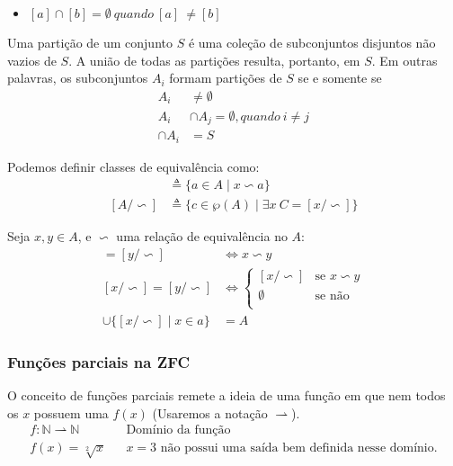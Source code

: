 \documentclass[12pt, a4paper]{article}
\begin{document}
\begin{itemize}
\item $[a] \cap [b] = \emptyset ~quando~ [a]~ \neq[b]$\\
\end{itemize}

Uma partição de um conjunto $S$ é uma coleção de subconjuntos disjuntos não vazios de $S$. A união de todas as partições resulta, portanto, em $S$. Em outras palavras, os subconjuntos $A_i$ formam partições de $S$ se e somente se\\
\begin{align*}
A_i &\neq \emptyset\\
A_i &\cap A_j = \emptyset, quando~i \neq j\\
\cap A_i &= S
\end{align*}

Podemos definir classes de equivalência como:\\
\begin{align*}
[x/\backsim] &\triangleq \{a \in A \mid x \backsim a \}\\
[A/\backsim] &\triangleq \{c \in \wp(A) \mid \exists x ~ C = [x/\backsim] \}
\end{align*}

Seja $x,y \in A$, e $\backsim$ uma relação de equivalência no $A$:
\begin{align*}
[x/\backsim] = [y/\backsim] &\iff x \backsim y\\
[x/\backsim] = [y/\backsim] &\iff
\begin{cases}
[x/\backsim] 	& \text{se } x \backsim y \\
\emptyset 		& \text{se não}\\
\end{cases}
\\
\cup\{[x/ \backsim] \mid x \in a \} &= A
\end{align*}

\subsubsection{Funções parciais na ZFC}
O conceito de funções parciais remete a ideia de uma função em que nem todos os $x$ possuem uma $f(x)$ (Usaremos a notação $\rightharpoonup$).
\begin{align*}
f: \mathbb{N} \rightharpoonup  \mathbb{N} && \text{Domínio da função}\\
f(x) = \sqrt[2]{x} && x = 3 \text{ não possui uma saída bem definida nesse domínio.}
\end{align*}
\end{document}
